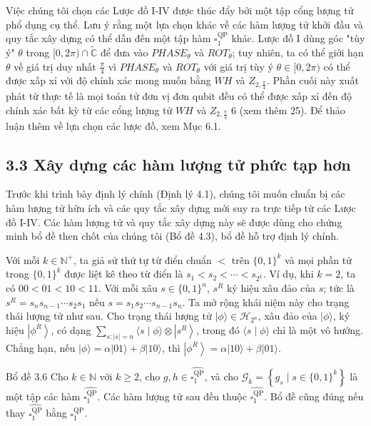 \documentclass[10pt]{article}
\begin{document}
Việc chúng tôi chọn các Lược đồ I-IV được thúc đẩy bởi một tập cổng lượng tử phổ dụng cụ thể. Lưu ý rằng một lựa chọn khác về các hàm lượng tử khởi đầu và quy tắc xây dựng có thể dẫn đến một tập hàm $\square_{1}^{\mathrm{QP}}$ khác. Lược đồ I dùng góc "tùy ý" $\theta$ trong $[0,2 \pi) \cap \widetilde{\mathbb{C}}$ để đưa vào $P H A S E_{\theta}$ và $R O T_{\theta}$; tuy nhiên, ta có thể giới hạn $\theta$ về giá trị duy nhất $\frac{\pi}{4}$ vì $P H A S E_{\theta}$ và $R O T_{\theta}$ với giá trị tùy ý $\theta \in[0,2 \pi)$ có thể được xấp xỉ với độ chính xác mong muốn bằng $W H$ và $Z_{2, \frac{\pi}{4}}$. Phần cuối này xuất phát từ thực tế là mọi toán tử đơn vị đơn qubit đều có thể được xấp xỉ đến độ chính xác bất kỳ từ các cổng lượng tử $W H$ và $Z_{2, \frac{\pi}{4}}$ 6 (xem thêm 25). Để thảo luận thêm về lựa chọn các lược đồ, xem Mục 6.1.

\subsection*{3.3 Xây dựng các hàm lượng tử phức tạp hơn}
Trước khi trình bày định lý chính (Định lý 4.1), chúng tôi muốn chuẩn bị các hàm lượng tử hữu ích và các quy tắc xây dựng mới suy ra trực tiếp từ các Lược đồ I-IV. Các hàm lượng tử và quy tắc xây dựng này sẽ được dùng cho chứng minh bổ đề then chốt của chúng tôi (Bổ đề 4.3), bổ đề hỗ trợ định lý chính.

Với mỗi $k \in \mathbb{N}^{+}$, ta giả sử thứ tự từ điển chuẩn $<$ trên $\{0,1\}^{k}$ và mọi phần tử trong $\{0,1\}^{k}$ được liệt kê theo từ điển là $s_{1}<s_{2}<\cdots<s_{2^{k}}$. Ví dụ, khi $k=2$, ta có $00<01<10<11$. Với mỗi xâu $s \in\{0,1\}^{n}$, $s^{R}$ ký hiệu xâu đảo của $s$; tức là $s^{R}=s_{n} s_{n-1} \cdots s_{2} s_{1}$ nếu $s=s_{1} s_{2} \cdots s_{n-1} s_{n}$. Ta mở rộng khái niệm này cho trạng thái lượng tử như sau. Cho trạng thái lượng tử $|\phi\rangle \in \mathcal{H}_{2^{n}}$, xâu đảo của $|\phi\rangle$, ký hiệu $\left|\phi^{R}\right\rangle$, có dạng $\sum_{s:|s|=n}\langle s \mid \phi\rangle \otimes\left|s^{R}\right\rangle$, trong đó $\langle s \mid \phi\rangle$ chỉ là một vô hướng. Chẳng hạn, nếu $|\phi\rangle=\alpha|01\rangle+\beta|10\rangle$, thì $\left|\phi^{R}\right\rangle=\alpha|10\rangle+\beta|01\rangle$.

Bổ đề 3.6 Cho $k \in \mathbb{N}$ với $k \geq 2$, cho $g, h \in \widehat{\square_{1}^{\mathrm{QP}}}$, và cho $\mathcal{G}_{k}=\left\{g_{s} \mid s \in\{0,1\}^{k}\right\}$ là một tập các hàm $\widehat{\square_{1}^{\mathrm{QP}}}$. Các hàm lượng tử sau đều thuộc $\widehat{\square_{1}^{\mathrm{QP}}}$. Bổ đề cũng đúng nếu thay $\widehat{\square_{1}^{\mathrm{QP}}}$ bằng $\square_{1}^{\mathrm{QP}}$.
\end{document}

